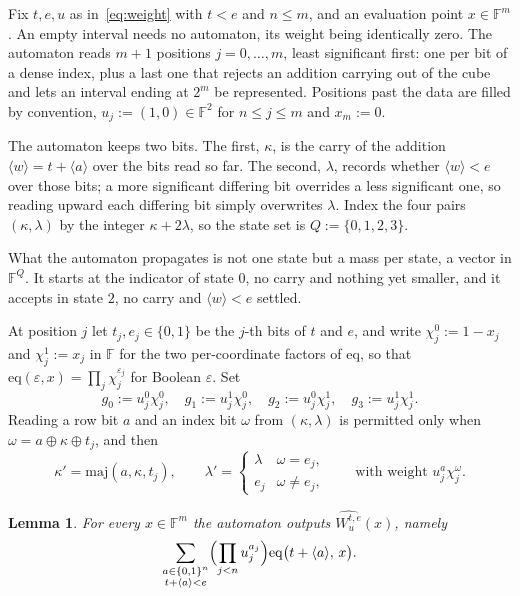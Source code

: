 \documentclass[11pt]{article}
\newcommand{\F}{\mathbb{F}}
\newcommand{\eq}{\mathrm{eq}}
\newcommand{\cube}[1]{\{0,1\}^{#1}}
\newcommand{\pol}[1]{\widehat{#1}}
\newcommand{\val}[1]{\langle #1 \rangle}
\newcommand{\maj}{\mathrm{maj}}
\theoremstyle{plain}
\newtheorem{lemma}{Lemma}[section]
\begin{document}
Fix $t,e,u$ as in~\eqref{eq:weight} with $t<e$ and $n\le m$, and an evaluation point
$x\in\F^m$. An empty interval needs no automaton, its weight being identically zero. The
automaton reads $m+1$ positions $j=0,\dots,m$, least significant first: one per bit of a dense
index, plus a last one that rejects an addition carrying out of the cube and lets an interval
ending at $2^m$ be represented. Positions past the data are filled by convention, $u_j:=(1,0)\in\F^2$ for
$n\le j\le m$ and $x_m:=0$.

The automaton keeps two bits. The first, $\kappa$, is the carry of the addition
$\val w=t+\val a$ over the bits read so far. The second, $\lambda$, records whether
$\val w<e$ over those bits; a more significant differing bit overrides a less significant one,
so reading upward each differing bit simply overwrites $\lambda$. Index the four pairs
$(\kappa,\lambda)$ by the integer $\kappa+2\lambda$, so the state set is $Q:=\{0,1,2,3\}$.

What the automaton propagates is not one state but a mass per state, a vector in $\F^Q$. It
starts at the indicator of state $0$, no carry and nothing yet smaller, and it accepts in state
$2$, no carry and $\val w<e$ settled.

At position $j$ let $t_j,e_j\in\{0,1\}$ be the $j$-th bits of $t$ and $e$, and write
$\chi_j^0:=1-x_j$ and $\chi_j^1:=x_j$ in $\F$ for the two per-coordinate factors of $\eq$, so
that $\eq(\varepsilon,x)=\prod_j\chi_j^{\varepsilon_j}$ for Boolean $\varepsilon$. Set
\[
  g_0:=u_j^0\chi_j^0,\quad g_1:=u_j^1\chi_j^0,\quad g_2:=u_j^0\chi_j^1,\quad g_3:=u_j^1\chi_j^1 .
\]
Reading a row bit $a$ and an index bit $\omega$ from $(\kappa,\lambda)$ is permitted only when
$\omega=a\oplus\kappa\oplus t_j$, and then
\[
  \kappa'=\maj(a,\kappa,t_j),\qquad
  \lambda'=\begin{cases}\lambda & \omega=e_j,\\ e_j & \omega\neq e_j,\end{cases}
  \qquad\text{with weight } u_j^a\chi_j^{\omega}.
\]

\begin{lemma}\label{lem:automaton}
For every $x\in\F^m$ the automaton outputs $\pol{W^{t,e}_u}(x)$, namely
\[
  \sum_{\substack{a\in\cube n\\ t+\val a<e}}\Bigl(\prod_{j<n}u_j^{a_j}\Bigr)\eq\bigl(t+\val a,\,x\bigr).
\]
\end{lemma}
\end{document}
